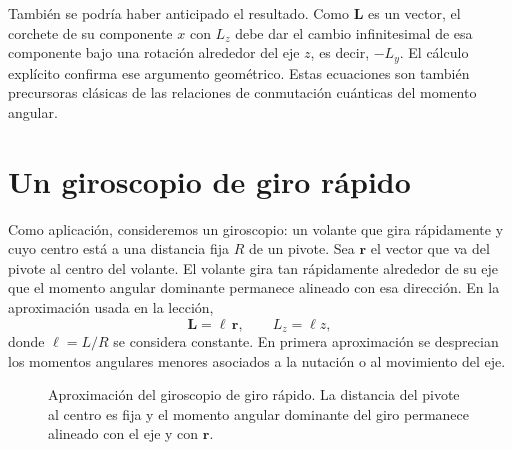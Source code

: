 También se podría haber anticipado el resultado. Como \(\boldsymbol L\) es un vector, el corchete de su componente \(x\) con \(L_z\) debe dar el cambio infinitesimal de esa componente bajo una rotación alrededor del eje \(z\), es decir, \(-L_y\). El cálculo explícito confirma ese argumento geométrico. Estas ecuaciones son también precursoras clásicas de las relaciones de conmutación cuánticas del momento angular.

\section{Un giroscopio de giro rápido}

Como aplicación, consideremos un giroscopio: un volante que gira rápidamente y cuyo centro está a una distancia fija \(R\) de un pivote. Sea \(\boldsymbol r\) el vector que va del pivote al centro del volante. El volante gira tan rápidamente alrededor de su eje que el momento angular dominante permanece alineado con esa dirección. En la aproximación usada en la lección,
\begin{equation}
  \boldsymbol L=\ell\,\boldsymbol r,
  \qquad
  L_z=\ell z,
  \label{eq:l8-L-parallel-r}
\end{equation}
donde \(\ell=L/R\) se considera constante. En primera aproximación se desprecian los momentos angulares menores asociados a la nutación o al movimiento del eje.

\begin{figure}[htbp]
  \centering
  \caption{Aproximación del giroscopio de giro rápido. La distancia del pivote al centro es fija y el momento angular dominante del giro permanece alineado con el eje y con \(\boldsymbol r\).}
\end{figure}

